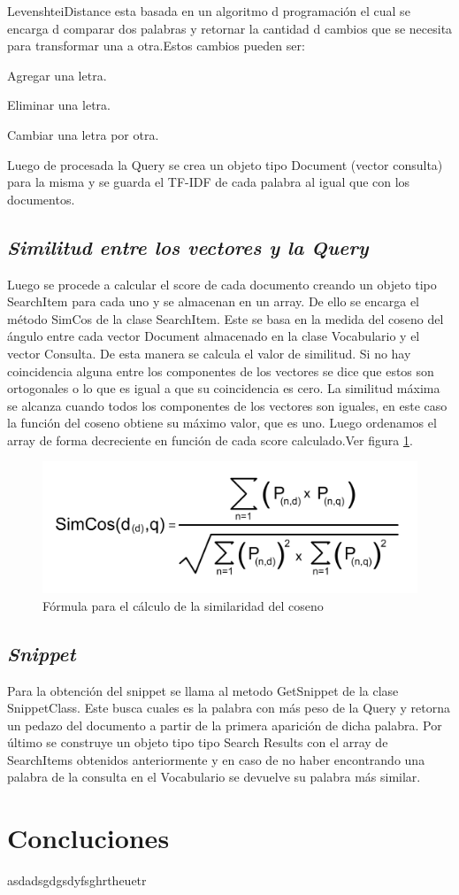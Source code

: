 \documentclass[12pt]{article}
\begin{document}
	LevenshteiDistance esta basada en un algoritmo d programación el cual se encarga d comparar
	dos palabras y retornar la cantidad d cambios que se necesita para transformar una a otra.Estos cambios pueden ser:
	
	Agregar una letra.
	
	Eliminar una letra.
	
	Cambiar una letra por otra.
	
	Luego de procesada la Query se crea un objeto tipo Document (vector consulta) para la misma y
	se guarda el TF-IDF de cada palabra al igual que con los documentos.
	\subsection{\textit{Similitud entre los vectores y la Query}}
	Luego se procede a calcular el score de cada documento creando un objeto tipo SearchItem para
	cada uno y se almacenan en un array. De ello se encarga el método SimCos de la clase
	SearchItem. Este se basa en la medida del coseno del ángulo entre cada vector Document
	almacenado en la clase Vocabulario y el vector Consulta. De esta manera se calcula el valor de
	similitud. Si no hay coincidencia alguna entre los componentes de los vectores se dice que estos
	son ortogonales o lo que es igual a que su coincidencia es cero. La similitud máxima se alcanza
	cuando todos los componentes de los vectores son iguales, en este caso la función del coseno
	obtiene su máximo valor, que es uno.
	Luego ordenamos el array de forma decreciente en función de cada score calculado.Ver figura \ref{fig:cos}.
	\begin{figure}[h!]
		\centering
		\includegraphics[scale=0.4]{simcos}
		\caption{Fórmula para el cálculo de la similaridad del coseno}
		\label{fig:cos}
	\end{figure}
	
	\subsection{\textit{Snippet}}
	Para la obtención del snippet se llama al metodo GetSnippet de la clase SnippetClass. Este busca
	cuales es la palabra con más peso de la Query y retorna un pedazo del documento a partir de la
	primera aparición de dicha palabra. Por último se construye un objeto tipo tipo Search Results con el array de SearchItems obtenidos
	anteriormente y en caso de no haber encontrando una palabra de la consulta en el Vocabulario
	se devuelve su palabra más similar.
	
	\section{Concluciones}
	asdadsgdgsdyfsghrtheuetr
	
	
\end{document}
